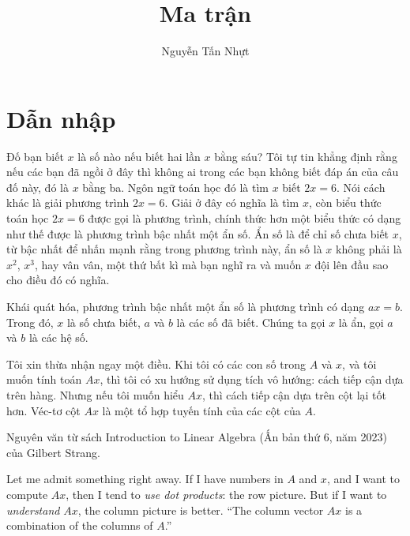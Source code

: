 \documentclass[12pt]{article} %
\title{Ma trận}
\author{Nguyễn Tấn Nhựt}
\date{}
\begin{document}
\maketitle

\section{Dẫn nhập}
Đố bạn biết \(x\) là số nào nếu biết hai lần \(x\) bằng sáu? Tôi tự tin khẳng định rằng nếu các bạn đã ngồi ở đây thì không ai trong các bạn không biết đáp án của câu đố này, đó là \(x\) bằng ba. Ngôn ngữ toán học đó là tìm \(x\) biết \(2x=6\). Nói cách khác là giải phương trình \(2x=6\). Giải ở đây có nghĩa là tìm \(x\), còn biểu thức toán học \(2x=6\) được gọi là phương trình, chính thức hơn một biểu thức có dạng như thế được là phương trình bậc nhất một ẩn số. Ẩn số là để chỉ số chưa biết \(x\), từ bậc nhất để nhấn mạnh rằng trong phương trình này, ẩn số là \(x\) không phải là \(x^2\), \(x^3\), hay vân vân, một thứ bất kì mà bạn nghĩ ra và muốn \(x\) đội lên đầu sao cho điều đó có nghĩa.

Khái quát hóa, phương trình bậc nhất một ẩn số là phương trình có dạng \(ax=b\). Trong đó, \(x\) là số chưa biết, \(a\) và \(b\) là các số đã biết. Chúng ta gọi \(x\) là ẩn, gọi \(a\) và \(b\) là các hệ số.


Tôi xin thừa nhận ngay một điều. Khi tôi có các con số trong $A$ và $x$, và tôi muốn tính toán $Ax$, thì tôi có xu hướng sử dụng tích vô hướng: cách tiếp cận dựa trên hàng. Nhưng nếu tôi muốn hiểu $Ax$, thì cách tiếp cận dựa trên cột lại tốt hơn. Véc-tơ cột $Ax$ là một tổ hợp tuyến tính của các cột của $A$.

Nguyên văn từ sách Introduction to Linear Algebra (Ấn bản thứ 6, năm 2023) của Gilbert Strang.

Let me admit something right away. If I have numbers in $A$ and $x$, and I want to compute $Ax$, then I tend to \emph{use dot products}: the row picture. But if I want to \emph{understand} $Ax$, the column picture is better. ``The column vector $Ax$ is a combination of the columns of $A$.''

\end{document}
